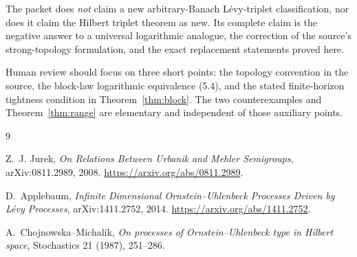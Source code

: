 \documentclass[11pt]{article}
\theoremstyle{remark}
\begin{document}
The packet does \emph{not} claim a new arbitrary-Banach L\'evy-triplet
classification, nor does it claim the Hilbert triplet theorem as new.  Its
complete claim is the negative answer to a universal logarithmic analogue,
the correction of the source's strong-topology formulation, and the exact
replacement statements proved here.

Human review should focus on three short points: the topology convention in
the source, the block-law logarithmic equivalence (5.4), and the stated
finite-horizon tightness condition in Theorem~\ref{thm:block}.  The two
counterexamples and Theorem~\ref{thm:range} are elementary and independent of
those auxiliary points.

\begin{thebibliography}{9}

Z.~J. Jurek,
\emph{On Relations Between Urbanik and Mehler Semigroups},
arXiv:0811.2989, 2008.
\url{https://arxiv.org/abs/0811.2989}.

D.~Applebaum,
\emph{Infinite Dimensional Ornstein--Uhlenbeck Processes Driven by L\'evy
Processes},
arXiv:1411.2752, 2014.
\url{https://arxiv.org/abs/1411.2752}.

A.~Chojnowska--Michalik,
\emph{On processes of Ornstein--Uhlenbeck type in Hilbert space},
Stochastics 21 (1987), 251--286.

\end{thebibliography}
\end{document}
